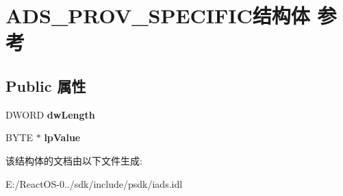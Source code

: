 \hypertarget{struct_a_d_s___p_r_o_v___s_p_e_c_i_f_i_c}{}\section{A\+D\+S\+\_\+\+P\+R\+O\+V\+\_\+\+S\+P\+E\+C\+I\+F\+I\+C结构体 参考}
\label{struct_a_d_s___p_r_o_v___s_p_e_c_i_f_i_c}
\subsection*{Public 属性}
\begin{DoxyCompactItemize}
\item 
\mbox{\label{struct_a_d_s___p_r_o_v___s_p_e_c_i_f_i_c_a821c38b30fbce155dde7c66510e51eaf}} 
D\+W\+O\+RD {\bfseries dw\+Length}
\item 
\mbox{\label{struct_a_d_s___p_r_o_v___s_p_e_c_i_f_i_c_aba3016ca9f7fb4fe717759965e29bd45}} 
B\+Y\+TE $\ast$ {\bfseries lp\+Value}
\end{DoxyCompactItemize}


该结构体的文档由以下文件生成\+:\begin{DoxyCompactItemize}
\item 
E\+:/\+React\+O\+S-\/0../sdk/include/psdk/iads.\+idl\end{DoxyCompactItemize}
